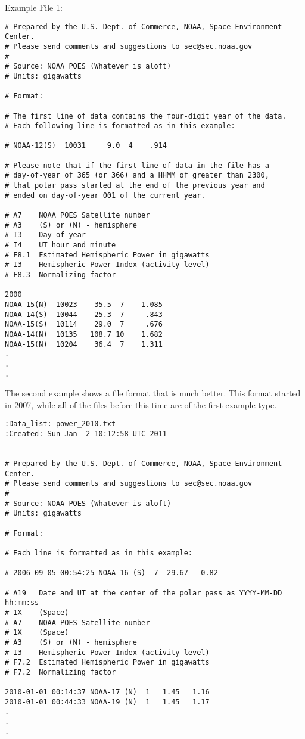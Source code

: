 Example File 1:

\begin{verbatim}
# Prepared by the U.S. Dept. of Commerce, NOAA, Space Environment Center.
# Please send comments and suggestions to sec@sec.noaa.gov 
# 
# Source: NOAA POES (Whatever is aloft)
# Units: gigawatts

# Format:

# The first line of data contains the four-digit year of the data.
# Each following line is formatted as in this example:

# NOAA-12(S)  10031     9.0  4    .914

# Please note that if the first line of data in the file has a
# day-of-year of 365 (or 366) and a HHMM of greater than 2300, 
# that polar pass started at the end of the previous year and
# ended on day-of-year 001 of the current year.

# A7    NOAA POES Satellite number
# A3    (S) or (N) - hemisphere
# I3    Day of year
# I4    UT hour and minute
# F8.1  Estimated Hemispheric Power in gigawatts
# I3    Hemispheric Power Index (activity level)
# F8.3  Normalizing factor

2000
NOAA-15(N)  10023    35.5  7    1.085
NOAA-14(S)  10044    25.3  7     .843
NOAA-15(S)  10114    29.0  7     .676
NOAA-14(N)  10135   108.7 10    1.682
NOAA-15(N)  10204    36.4  7    1.311
.
.
.
\end{verbatim}

The second example shows a file format that is much better.  This
format started in 2007, while all of the files before this time are of
the first example type.

\begin{verbatim}
:Data_list: power_2010.txt
:Created: Sun Jan  2 10:12:58 UTC 2011


# Prepared by the U.S. Dept. of Commerce, NOAA, Space Environment Center.
# Please send comments and suggestions to sec@sec.noaa.gov 
# 
# Source: NOAA POES (Whatever is aloft)
# Units: gigawatts

# Format:

# Each line is formatted as in this example:

# 2006-09-05 00:54:25 NOAA-16 (S)  7  29.67   0.82

# A19   Date and UT at the center of the polar pass as YYYY-MM-DD hh:mm:ss
# 1X    (Space)
# A7    NOAA POES Satellite number
# 1X    (Space)
# A3    (S) or (N) - hemisphere
# I3    Hemispheric Power Index (activity level)
# F7.2  Estimated Hemispheric Power in gigawatts
# F7.2  Normalizing factor

2010-01-01 00:14:37 NOAA-17 (N)  1   1.45   1.16
2010-01-01 00:44:33 NOAA-19 (N)  1   1.45   1.17
.
.
.
\end{verbatim}


